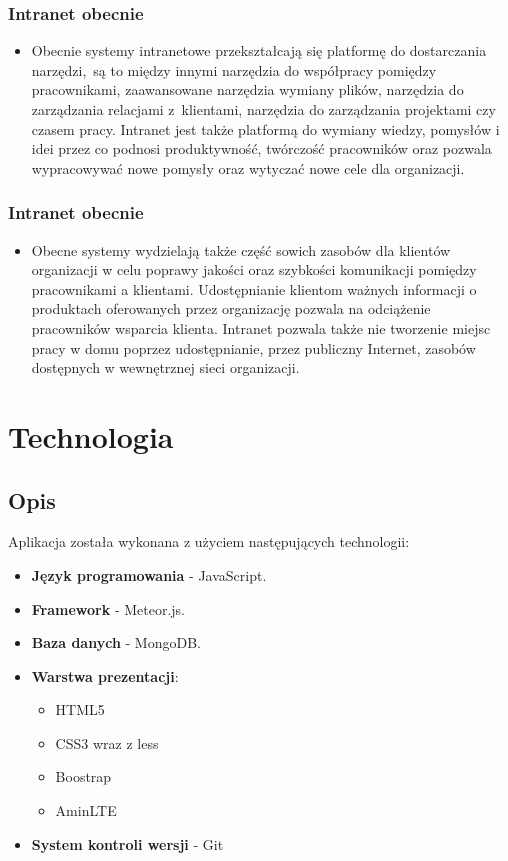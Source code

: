 \documentclass{beamer}
\newenvironment{justbe}%
{\setlength{\leftmargini}{0pt}\begin{itemize}\item[]}%
{\end{itemize}}
\begin{document}
\begin{frame}
	\frametitle{Intranet obecnie}
	\begin{justbe}
	Obecnie systemy intranetowe przekształcają się platformę do dostarczania narzędzi,~są to między innymi narzędzia do współpracy pomiędzy pracownikami, zaawansowane narzędzia wymiany plików, narzędzia do zarządzania relacjami z~klientami, narzędzia do zarządzania projektami czy czasem pracy. Intranet jest także platformą do wymiany wiedzy, pomysłów i idei przez co podnosi produktywność, twórczość pracowników oraz pozwala wypracowywać nowe pomysły oraz wytyczać nowe cele dla organizacji. 
	\end{justbe}
\end{frame}

\begin{frame}
  \frametitle{Intranet obecnie}
  \begin{justbe}
   Obecne systemy wydzielają także część sowich zasobów dla klientów organizacji w celu poprawy jakości oraz szybkości komunikacji pomiędzy pracownikami a klientami. Udostępnianie klientom ważnych informacji o produktach oferowanych przez organizację pozwala na odciążenie pracowników wsparcia klienta. Intranet pozwala także nie tworzenie miejsc pracy w domu poprzez udostępnianie, przez publiczny Internet, zasobów dostępnych w wewnętrznej sieci organizacji. 
  \end{justbe}
\end{frame}

\section{Technologia}
\subsection{Opis}
\begin{frame}
	Aplikacja została wykonana z użyciem następujących technologii:
	\begin{itemize}
		\item \textbf{Język programowania} - JavaScript.
		\item \textbf{Framework} - Meteor.js.
		\item \textbf{Baza danych} - MongoDB.
		\item \textbf{Warstwa prezentacji}:
		\begin{itemize}
		 \item HTML5
		 \item CSS3 wraz z less
		 \item Boostrap
		 \item AminLTE
		\end{itemize}
		\item \textbf{System kontroli wersji} - Git
	\end{itemize}
\end{frame}
\end{document}
